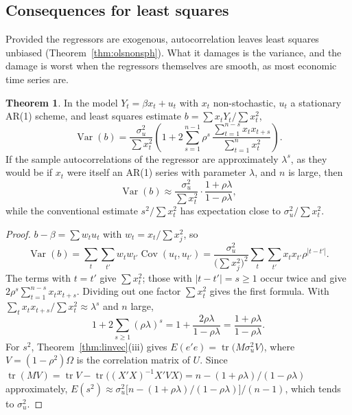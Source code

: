 \documentclass[11pt,a4paper]{article}
\numberwithin{equation}{section}
\DeclareMathOperator{\Var}{Var}
\DeclareMathOperator{\Cov}{Cov}
\DeclareMathOperator{\tr}{tr}
\theoremstyle{definition}
\newtheorem{thm}{Theorem}[subsection]
\begin{document}
\subsection{Consequences for least squares}
\label{ssec:accons}

Provided the regressors are exogenous, autocorrelation leaves least squares unbiased (Theorem~\ref{thm:olsnonsph}). What it damages is the variance,
and the damage is worst when the regressors themselves are smooth, as most economic time series are.

\begin{thm}
\label{thm:acols}
In the model $Y_t = \beta x_t + u_t$ with $x_t$ non-stochastic, $u_t$ a stationary AR(1) scheme, and least squares estimate $b = \sum x_tY_t/\sum x_t^2$,
\[
\Var(b) = \frac{\sigma_u^2}{\sum x_t^2}\left(1 + 2\sum_{s=1}^{n-1}\rho^s\,\frac{\sum_{t=1}^{n-s}x_tx_{t+s}}{\sum_{t=1}^n x_t^2}\right) .
\]
If the sample autocorrelations of the regressor are approximately $\lambda^s$, as they would be if $x_t$ were itself an AR(1) series with parameter
$\lambda$, and $n$ is large, then
\[
\Var(b) \approx \frac{\sigma_u^2}{\sum x_t^2}\cdot\frac{1 + \rho\lambda}{1 - \rho\lambda},
\]
while the conventional estimate $s^2/\sum x_t^2$ has expectation close to $\sigma_u^2/\sum x_t^2$.
\end{thm}

\begin{proof}
$b - \beta = \sum w_tu_t$ with $w_t = x_t/\sum x_j^2$, so
\[
\Var(b) = \sum_t\sum_{t'}w_tw_{t'}\Cov(u_t, u_{t'}) = \frac{\sigma_u^2}{\bigl(\sum x_j^2\bigr)^2}\sum_t\sum_{t'}x_tx_{t'}\rho^{|t - t'|} .
\]
The terms with $t = t'$ give $\sum x_t^2$; those with $|t - t'| = s \geq 1$ occur twice and give $2\rho^s\sum_{t=1}^{n-s}x_tx_{t+s}$. Dividing out one factor $\sum x_t^2$ gives
the first formula. With $\sum_t x_tx_{t+s}/\sum x_t^2 \approx \lambda^s$ and $n$ large,
\[
1 + 2\sum_{s\geq1}(\rho\lambda)^s = 1 + \frac{2\rho\lambda}{1 - \rho\lambda} = \frac{1 + \rho\lambda}{1 - \rho\lambda} .
\]
For $s^2$, Theorem~\ref{thm:linvec}(iii) gives $E(e'e) = \tr\bigl(M\sigma_u^2V\bigr)$, where $V = (1 - \rho^2)\Omega$ is the correlation matrix of $U$. Since
$\tr(M V) = \tr V - \tr\bigl((X'X)^{-1}X'VX\bigr) = n - (1 + \rho\lambda)/(1 - \rho\lambda)$ approximately, $E(s^2) \approx \sigma_u^2\bigl[n - (1 + \rho\lambda)/(1 - \rho\lambda)\bigr]/(n - 1)$,
which tends to $\sigma_u^2$.
\end{proof}
\end{document}

